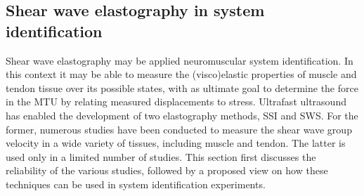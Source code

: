 \subsection{Shear wave elastography in system identification}
\label{sec:swe_in_sys_id}
Shear wave elastography may be applied neuromuscular system identification. In this context it may be able to measure the (visco)elastic properties of muscle and tendon tissue over its possible states, with as ultimate goal to determine the force in the MTU by relating measured displacements to stress. 
Ultrafast ultrasound has enabled the development of two elastography methods, SSI and SWS. For the former, numerous studies have been conducted to measure the shear wave group velocity in a wide variety of tissues, including muscle and tendon. The latter is used only in a limited number of studies. This section first discusses the reliability of the various studies, followed by a proposed view on how these techniques can be used in system identification experiments. 




